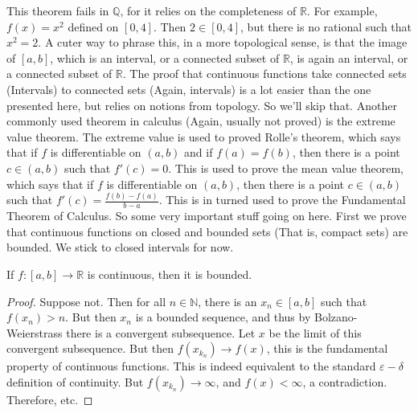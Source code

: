 \documentclass[crop=false,class=book,oneside]{standalone}
\begin{document}
            This theorem fails in $\mathbb{Q}$, for it relies
            on the completeness of $\mathbb{R}$. For example,
            $f(x)=x^{2}$ defined on $[0,4]$.
            Then $2\in[0,4]$, but there is no
            rational such that $x^{2}=2$.
            A cuter way to phrase this, in a more topological
            sense, is that the image of $[a,b]$, which is an
            interval, or a connected subset of $\mathbb{R}$,
            is again an interval, or a connected subset of
            $\mathbb{R}$. The proof that continuous
            functions take connected sets (Intervals)
            to connected sets (Again, intervals) is a lot
            easier than the one presented
            here, but relies on notions from topology.
            So we'll skip that.
            Another commonly used theorem in calculus
            (Again, usually not proved) is the extreme
            value theorem.
            The extreme value is used to proved Rolle's theorem,
            which says that if $f$ is differentiable on $(a,b)$
            and if $f(a)=f(b)$, then there is a point
            $c\in(a,b)$ such that $f'(c)=0$. This is used to
            prove the mean value theorem, which says that
            if $f$ is differentiable on $(a,b)$,
            then there is a point $c\in(a,b)$ such that
            $f'(c)=\frac{f(b)-f(a)}{b-a}$. This is in
            turned used to prove the Fundamental Theorem
            of Calculus. So some very important stuff going
            on here. First we prove that continuous functions
            on closed and bounded sets (That is,
            compact sets) are bounded. We stick to
            closed intervals for now.
            \begin{theorem}
                    If $f:[a,b]\rightarrow\mathbb{R}$ is
                    continuous, then it is bounded.
                \end{theorem}
            \begin{proof}
                    Suppose not. Then for all $n\in\mathbb{N}$, 
                    there is an $x_{n}\in[a,b]$ such that
                    $f(x_{n})>n$. But then
                    $x_{n}$ is a bounded sequence, and thus by
                    Bolzano-Weierstrass there is a convergent
                    subsequence. Let $x$ be the limit of this
                    convergent subsequence.
                    But then $f(x_{k_{n}})\rightarrow{f(x)}$,
                    this is the fundamental property of
                    continuous functions. This is indeed
                    equivalent to the standard
                    $\varepsilon-\delta$ definition of continuity.
                    But $f(x_{k_{n}})\rightarrow\infty$,
                    and $f(x)<\infty$, a contradiction.
                    Therefore, etc.
                \end{proof}
\end{document}
